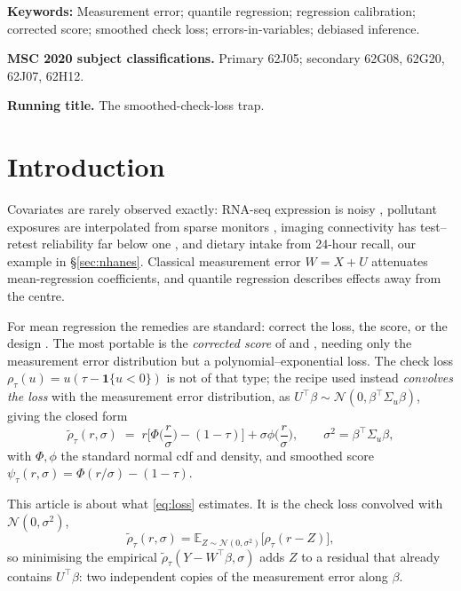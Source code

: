 \documentclass[12pt,a4paper]{article}
\theoremstyle{definition}
\theoremstyle{remark}
\newcommand{\E}{\mathbb{E}}
\newcommand{\cN}{\mathcal{N}}
\newcommand{\ind}[1]{\mathbf{1}\{#1\}}
\newcommand{\rht}{\tilde{\rho}_\tau}
\newcommand{\psit}{\psi_\tau}
\begin{document}
\noindent\textbf{Keywords:} Measurement error; quantile regression; regression
calibration; corrected score; smoothed check loss; errors-in-variables; debiased inference.

\medskip
\noindent\textbf{MSC 2020 subject classifications.} Primary 62J05; secondary 62G08, 62G20,
62J07, 62H12.

\medskip
\noindent\textbf{Running title.} The smoothed-check-loss trap.

\section{Introduction}

Covariates are rarely observed exactly: RNA-seq expression is noisy
\citep{carroll2006measurement}, pollutant exposures are interpolated from sparse monitors
\citep{gryparis2009measurement}, imaging connectivity has test--retest reliability far below
one \citep{noble2017}, and dietary intake from 24-hour recall, our example in
\S\ref{sec:nhanes}. Classical measurement error $W=X+U$ attenuates mean-regression
coefficients, and quantile regression \citep{koenker1978} describes effects away from the
centre.

For mean regression the remedies are standard: correct the loss, the score, or the design
\citep{fuller1987,carroll2006measurement}. The most portable is the \emph{corrected score} of
\citet{stefanski1989} and \citet{nakamura1990}, needing only the measurement error
distribution but a polynomial--exponential loss. The check loss
$\rho_\tau(u)=u(\tau-\ind{u<0})$ is not of that type; the recipe used instead
\emph{convolves the loss} with the measurement error distribution, as
$U^\top\beta\sim\cN(0,\beta^\top\Sigma_u\beta)$, giving the closed form
\begin{equation}
\rht(r,\sigma) \;=\; r\Big[\Phi\!\Big(\frac{r}{\sigma}\Big)-(1-\tau)\Big]
+ \sigma\phi\!\Big(\frac{r}{\sigma}\Big),
\qquad \sigma^2 = \beta^\top\Sigma_u\beta,
\label{eq:loss}
\end{equation}
with $\Phi,\phi$ the standard normal cdf and density, and smoothed score
$\psit(r,\sigma)=\Phi(r/\sigma)-(1-\tau)$.

This article is about what \eqref{eq:loss} estimates. It is the check loss convolved
with $\cN(0,\sigma^2)$,
\begin{equation}
\rht(r,\sigma) = \E_{Z\sim\cN(0,\sigma^2)}\big[\rho_\tau(r-Z)\big],
\label{eq:identity}
\end{equation}
so minimising the empirical $\rht(Y-W^\top\beta,\sigma)$ adds $Z$ to a residual that already
contains $U^\top\beta$: two independent copies of the measurement error along $\beta$.
\end{document}
